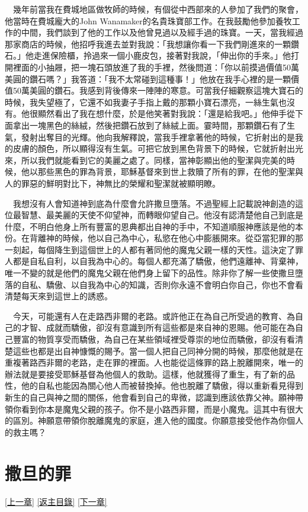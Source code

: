 \documentclass{book}
\begin{document}
　幾年前當我在費城地區做牧師的時候，有個從中西部來的人參加了我們的聚會，他當時在費城龐大的John Wanamaker的名貴珠寶部工作。在我鼓勵他參加養牧工作的中間，我們談到了他的工作以及他曾見過以及經手過的珠寶。一天，當我經過那家商店的時候，他招呼我進去並對我說：「我想讓你看一下我們剛進來的一顆鑽石。」他走進保險櫃，拎過來一個小鹿皮包，接著對我說，「伸出你的手來。」他打開裡面的小抽屜，把一塊石頭放進了我的手裡，然後問道：「你以前摸過價值50萬美圓的鑽石嗎？」我答道：「我不太常碰到這種事！」他放在我手心裡的是一顆價值50萬美圓的鑽石。我感到背後傳來一陣陣的寒意。可當我仔細觀察這塊大寶石的時候，我失望極了，它還不如我妻子手指上戴的那顆小寶石漂亮，一絲生氣也沒有。他很顯然看出了我在想什麼，於是他笑著對我說：「還是給我吧。」他伸手從下面拿出一塊黑色的絲絨，然後把鑽石放到了絲絨上面。霎時間，那顆鑽石有了生氣，發射出奪目的光輝。他向我解釋說，當我手裡拿著他的時候，它折射出的是我的皮膚的顏色，所以顯得沒有生氣。可把它放到黑色背景下的時候，它就折射出光來，所以我們就能看到它的美麗之處了。同樣，當神彰顯出他的聖潔與完美的時候，他以那些黑色的罪為背景，耶穌基督來到世上救贖了所有的罪，在他的聖潔與人的罪惡的鮮明對比下，神無比的榮耀和聖潔就被顯明瞭。

　我想沒有人會知道神到底為什麼會允許撒旦墮落。不過聖經上記載說神創造的這位最智慧、最美麗的天使不仰望神，而轉眼仰望自己。他沒有認清楚他自己到底是什麼，不明白他身上所有豐富的恩典都出自神的手中，不知道順服神應該是他的本份。在背離神的時候，他以自己為中心，私慾在他心中膨脹開來。從亞當犯罪的那一刻起，每個降生到這個世上的人都有著同他的魔鬼父親一樣的天性。這決定了罪人都是自私自利，以自我為中心的。每個人都充滿了驕傲，他們遠離神、背棄神，唯一不變的就是他們的魔鬼父親在他們身上留下的品性。除非你了解一些使撒旦墮落的自私、驕傲、以自我為中心的知識，否則你永遠不會明白你自己，你也不會看清楚每天來到這世上的誘惑。

　今天，可能還有人在走路西非爾的老路。或許他正在為自己所受過的教育、為自己的才智、成就而驕傲，卻沒有意識到所有這些都是來自神的恩賜。他可能在為自己豐富的物質享受而驕傲，為自己在某些領域裡受尊崇的地位而驕傲，卻沒有看清楚這些也都是出自神慷慨的賜予。當一個人把自己同神分開的時候，那麼他就是在重複著路西非爾的老路，走在罪的裡面。人也能從這條罪的路上脫離開來，唯一的辦法就是要接受耶穌基督為他個人的救助。這樣，他就獲得了重生，有了新的品性，他的自私也能因為關心他人而被替換掉。他也脫離了驕傲，得以重新看見得到新生的自己與神之間的關係，他會看到自己的卑微，認識到應該依靠父神。願神帶領你看到你本是魔鬼父親的孩子。你不是小路西非爾，而是小魔鬼。這其中有很大的區別。神願意帶領你脫離魔鬼的家庭，進入他的國度。你願意接受他作為你個人的救主嗎？

\chapter{撒旦的罪}
\label{sec:ch02}
\hyperref[sec:ch01]{[上一章]}
\hyperlink{toc}{[返主目錄]}
\hyperref[sec:ch03]{[下一章]}
\end{document}
